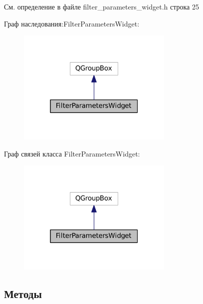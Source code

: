 См. определение в файле filter\+\_\+parameters\+\_\+widget.\+h строка 25



Граф наследования\+:Filter\+Parameters\+Widget\+:\nopagebreak
\begin{figure}[H]
\begin{center}
\leavevmode
\includegraphics[width=211pt]{class_filter_parameters_widget__inherit__graph}
\end{center}
\end{figure}


Граф связей класса Filter\+Parameters\+Widget\+:\nopagebreak
\begin{figure}[H]
\begin{center}
\leavevmode
\includegraphics[width=211pt]{class_filter_parameters_widget__coll__graph}
\end{center}
\end{figure}


\subsection{Методы}
\hypertarget{class_filter_parameters_widget_aac02d00c8d38c893f046e160765ded10}{}\label{class_filter_parameters_widget_aac02d00c8d38c893f046e160765ded10} 
